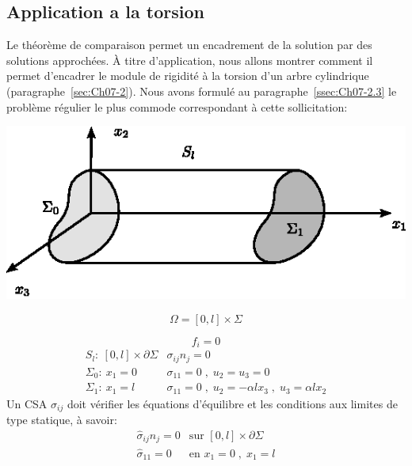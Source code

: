 \subsection{Application a la torsion} \label{ssec:Ch09-1.4}
Le théorème de comparaison permet un encadrement de la solution par des solutions approchées.
À titre d'application, nous allons montrer comment il permet d'encadrer le module de rigidité à la torsion d'un arbre cylindrique (paragraphe~\ref{sec:Ch07-2}).
Nous avons formulé au paragraphe~\ref{ssec:Ch07-2.3} le problème régulier le plus commode correspondant à cette sollicitation: 
\begin{multicols}{2}
    \begin{center}
        \includegraphics{../images/T1_Ch09-01}
    \end{center}
    \[
        \Omega = [0,l]\times \Sigma
    \]
\end{multicols}
\[
f_i = 0
\]
\begin{equation}
    \begin{aligned}
        S_l:\ [0,l] \times \partial \Sigma & \sigma_{ij} n_j = 0 \\
        \Sigma_0:\ x_1 = 0 & \sigma_{11} = 0 \;,\; u_2 = u_3 = 0 \\
        \Sigma_1:\ x_1 = l & \sigma_{11} = 0 \;,\; u_2 = -\alpha l x_3 \;,\; u_3 = \alpha l x_2
    \end{aligned}
    \label{eq:Ch09-033}
\end{equation}
Un CSA $\hat{\sigma}_{ij}$ doit vérifier les équations d'équilibre et les conditions aux limites de type statique, à savoir:
\begin{equation}
    \begin{aligned}
        \hat{\sigma}_{ij} n_j = 0 & \text{sur } [0,l] \times \partial \Sigma \\
        \hat{\sigma}_{11} = 0 & \text{en } x_1= 0 \;,\; x_1=l
    \end{aligned}
    \label{eq:Ch09-034}
\end{equation}
